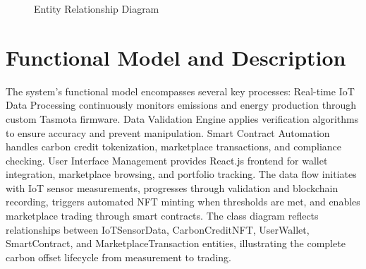 \documentclass[oneside,a4paper,12pt]{book}
\begin{document}
\newpage
\begin{center}
    \begin{figure}[!htbp]
        \centering
      \caption{Entity Relationship Diagram}
      \label{fig:usecase}
    \end{figure}
\end{center}  
\newpage


\section{Functional Model and Description}  
The system's functional model encompasses several key processes: Real-time IoT Data Processing continuously monitors emissions and energy production through custom Tasmota firmware. Data Validation Engine applies verification algorithms to ensure accuracy and prevent manipulation. Smart Contract Automation handles carbon credit tokenization, marketplace transactions, and compliance checking. User Interface Management provides React.js frontend for wallet integration, marketplace browsing, and portfolio tracking. The data flow initiates with IoT sensor measurements, progresses through validation and blockchain recording, triggers automated NFT minting when thresholds are met, and enables marketplace trading through smart contracts. The class diagram reflects relationships between IoTSensorData, CarbonCreditNFT, UserWallet, SmartContract, and MarketplaceTransaction entities, illustrating the complete carbon offset lifecycle from measurement to trading.
\end{document}
